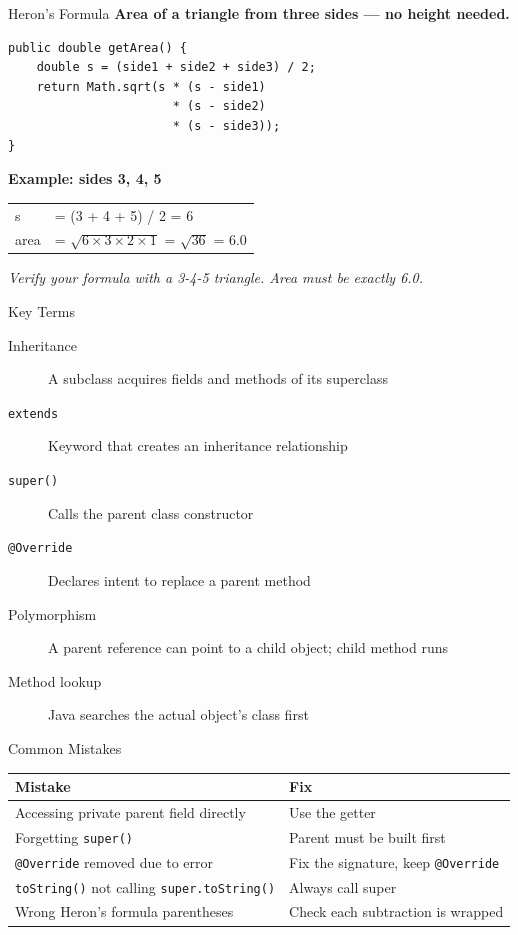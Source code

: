 \documentclass{beamer}
\begin{document}
\begin{frame}[fragile]{Heron's Formula}
\textbf{Area of a triangle from three sides --- no height needed.}
\begin{lstlisting}
public double getArea() {
    double s = (side1 + side2 + side3) / 2;
    return Math.sqrt(s * (s - side1)
                       * (s - side2)
                       * (s - side3));
}
\end{lstlisting}
\vspace{0.3cm}
\textbf{Example: sides 3, 4, 5}
\begin{tabular}{ll}
s & = (3 + 4 + 5) / 2 = 6 \\
area & = $\sqrt{6 \times 3 \times 2 \times 1}$ = $\sqrt{36}$ = 6.0 \\
\end{tabular}
\vspace{0.3cm}
\textit{Verify your formula with a 3-4-5 triangle. Area must be exactly 6.0.}
\end{frame}
\begin{frame}{Key Terms}
\begin{description}
  \item[Inheritance] A subclass acquires fields and methods of its superclass
  \item[\texttt{extends}] Keyword that creates an inheritance relationship
  \item[\texttt{super()}] Calls the parent class constructor
  \item[\texttt{@Override}] Declares intent to replace a parent method
  \item[Polymorphism] A parent reference can point to a child object; child method runs
  \item[Method lookup] Java searches the actual object's class first
\end{description}
\end{frame}
\begin{frame}{Common Mistakes}
\begin{tabular}{ll}
\toprule
\textbf{Mistake} & \textbf{Fix} \\
\midrule
Accessing private parent field directly & Use the getter \\
Forgetting \texttt{super()} & Parent must be built first \\
\texttt{@Override} removed due to error & Fix the signature, keep \texttt{@Override} \\
\texttt{toString()} not calling \texttt{super.toString()} & Always call super \\
Wrong Heron's formula parentheses & Check each subtraction is wrapped \\
\bottomrule
\end{tabular}
\end{frame}
\end{document}
